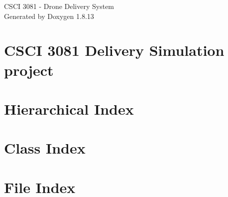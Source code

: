 \documentclass[twoside]{book}
\newcommand{\+}{\discretionary{\mbox{\scriptsize$\hookleftarrow$}}{}{}}
\newcommand{\clearemptydoublepage}{%
  \newpage{\pagestyle{empty}\cleardoublepage}%
}
\begin{document}
\hypersetup{pageanchor=false,
             bookmarksnumbered=true,
             pdfencoding=unicode
            }
\begin{titlepage}
\vspace*{7cm}
\begin{center}%
{\Large C\+S\+CI 3081 -\/ Drone Delivery System }\\
\vspace*{1cm}
{\large Generated by Doxygen 1.8.13}\\
\end{center}
\end{titlepage}
\clearemptydoublepage
{}
\tableofcontents
\clearemptydoublepage
{}
\hypersetup{pageanchor=true}

\chapter{C\+S\+CI 3081 Delivery Simulation project}
\label{index}\hypertarget{index}{}
\chapter{Hierarchical Index}

\chapter{Class Index}

\chapter{File Index}

\end{document}
